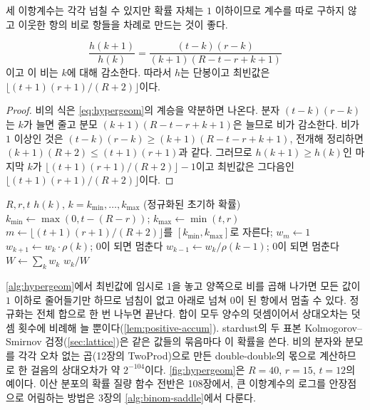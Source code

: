 세 이항계수는 각각 넘칠 수 있지만 확률 자체는 $1$ 이하이므로 계수를 따로 구하지 않고 이웃한 항의 비로 항들을 차례로 만드는 것이 좋다.

\begin{proposition}
\label{prop:hypergeom-mode}
\[
\frac{h(k+1)}{h(k)}=\frac{(t-k)(r-k)}{(k+1)(R-t-r+k+1)}
\]
이고 이 비는 $k$에 대해 감소한다. 따라서 $h$는 단봉이고 최빈값은 $\lfloor(t+1)(r+1)/(R+2)\rfloor$이다.
\end{proposition}

\begin{proof}
비의 식은 \cref{eq:hypergeom}의 계승을 약분하면 나온다. 분자 $(t-k)(r-k)$는 $k$가 늘면 줄고 분모 $(k+1)(R-t-r+k+1)$은 늘므로 비가 감소한다. 비가 $1$ 이상인 것은 $(t-k)(r-k)\ge(k+1)(R-t-r+k+1)$, 전개해 정리하면 $(k+1)(R+2)\le(t+1)(r+1)$과 같다. 그러므로 $h(k+1)\ge h(k)$인 마지막 $k$가 $\lfloor(t+1)(r+1)/(R+2)\rfloor-1$이고 최빈값은 그다음인 $\lfloor(t+1)(r+1)/(R+2)\rfloor$이다.
\end{proof}

\begin{algorithm}[htbp]
\begin{algorithmic}[1]
\Require $R,r,t$
\Ensure $h(k)$, $k=k_{\min},\dots,k_{\max}$ (정규화된 초기하 확률)
\State $k_{\min}\gets\max(0,t-(R-r))$; $k_{\max}\gets\min(t,r)$ 
\State $m\gets\lfloor(t+1)(r+1)/(R+2)\rfloor$를 $[k_{\min},k_{\max}]$로 자른다; $w_m\gets1$
 $w_{k+1}\gets w_k\cdot\rho(k)$; $0$이 되면 멈춘다 
\EndFor
{} $w_{k-1}\gets w_k/\rho(k-1)$; $0$이 되면 멈춘다
\EndFor
\State $W\gets\sum_kw_k$ 
\State \Return $w_k/W$
\end{algorithmic}
\caption{최빈값에서 바깥으로 만드는 초기하 확률 (stardust 의 )}
\label{alg:hypergeom}
\end{algorithm}

\cref{alg:hypergeom}에서 최빈값에 임시로 $1$을 놓고 양쪽으로 비를 곱해 나가면 모든 값이 $1$ 이하로 줄어들기만 하므로 넘침이 없고 아래로 넘쳐 $0$이 된 항에서 멈출 수 있다. 정규화는 전체 합으로 한 번 나누면 끝난다. 합이 모두 양수의 덧셈이어서 상대오차는 덧셈 횟수에 비례해 늘 뿐이다(\cref{lem:positive-accum}). stardust의 두 표본 Kolmogorov--Smirnov 검정(\cref{sec:lattice})은 같은 값들의 묶음마다 이 확률을 쓴다. 비의 분자와 분모를 각각 오차 없는 곱(12장의 TwoProd)으로 만든 double-double의 몫으로 계산하므로 한 걸음의 상대오차가 약 $2^{-104}$이다. \cref{fig:hypergeom}은 $R=40$, $r=15$, $t=12$의 예이다. 이산 분포의 확률 질량 함수 전반은 108장에서, 큰 이항계수의 로그를 안장점으로 어림하는 방법은 3장의 \cref{alg:binom-saddle}에서 다룬다.

